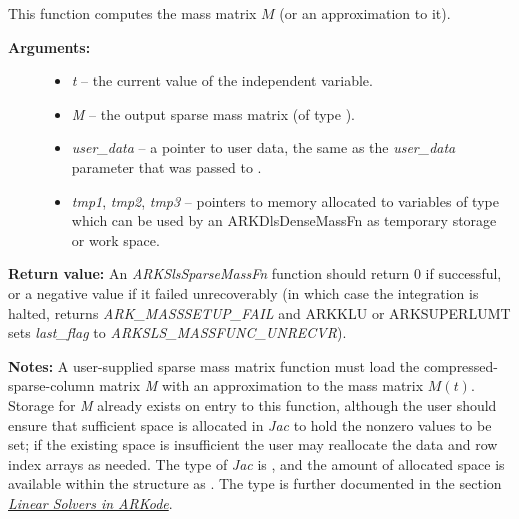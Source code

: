 \documentclass[letterpaper,10pt,english]{sphinxmanual}
\begin{document}
\begin{fulllineitems}
\label{c_interface/User_supplied:ARKSlsSparseMassFn}
This function computes the mass matrix $M$ (or an approximation to it).
\begin{description}
\item[{\textbf{Arguments:}}] \leavevmode\begin{itemize}
\item {} 
\emph{t} -- the current value of the independent variable.

\item {} 
\emph{M} -- the output sparse mass matrix (of type ).

\item {} 
\emph{user\_data} -- a pointer to user data, the same as the
\emph{user\_data} parameter that was passed to {\hyperref[c_interface/User_callable:ARKodeSetUserData]{}}.

\item {} 
\emph{tmp1}, \emph{tmp2}, \emph{tmp3} -- pointers to memory allocated to
variables of type  which can be used by an
ARKDlsDenseMassFn as temporary storage or work space.

\end{itemize}

\end{description}

\textbf{Return value:}
An \emph{ARKSlsSparseMassFn} function should return 0 if
successful, or a negative value if it failed unrecoverably (in
which case the integration is halted, {\hyperref[c_interface/User_callable:ARKode]{}} returns
\emph{ARK\_MASSSETUP\_FAIL} and ARKKLU or ARKSUPERLUMT sets \emph{last\_flag} to
\emph{ARKSLS\_MASSFUNC\_UNRECVR}).

\textbf{Notes:} A user-supplied sparse mass matrix function must load the
compressed-sparse-column matrix \emph{M} with an approximation to the
mass matrix $M(t)$.  Storage for \emph{M} already exists on entry
to this function, although the user should ensure that sufficient
space is allocated in \emph{Jac} to hold the nonzero values to be set;
if the existing space is insufficient the user may reallocate the
data and row index arrays as needed.  The type of \emph{Jac} is
, and the amount of allocated space is available within
the  structure as .  The  type is
further documented in the section {\hyperref[linear_solvers/index:linearsolvers]{\emph{Linear Solvers in ARKode}}}.

\end{fulllineitems}
\end{document}
